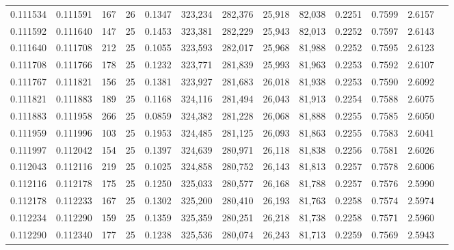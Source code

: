 \begin{tabular}{rrrrrrrrrrrrr}
0.111534 & 0.111591 &   167 &  26 &                                     0.1347 & 323,234 & 282,376 &  25,918 &  82,038 & 0.2251 & 0.7599 & 2.6157 \\
0.111592 & 0.111640 &   147 &  25 &                                     0.1453 & 323,381 & 282,229 &  25,943 &  82,013 & 0.2252 & 0.7597 & 2.6143 \\
0.111640 & 0.111708 &   212 &  25 &                                     0.1055 & 323,593 & 282,017 &  25,968 &  81,988 & 0.2252 & 0.7595 & 2.6123 \\
0.111708 & 0.111766 &   178 &  25 &                                     0.1232 & 323,771 & 281,839 &  25,993 &  81,963 & 0.2253 & 0.7592 & 2.6107 \\
0.111767 & 0.111821 &   156 &  25 &                                     0.1381 & 323,927 & 281,683 &  26,018 &  81,938 & 0.2253 & 0.7590 & 2.6092 \\
0.111821 & 0.111883 &   189 &  25 &                                     0.1168 & 324,116 & 281,494 &  26,043 &  81,913 & 0.2254 & 0.7588 & 2.6075 \\
0.111883 & 0.111958 &   266 &  25 &                                     0.0859 & 324,382 & 281,228 &  26,068 &  81,888 & 0.2255 & 0.7585 & 2.6050 \\
0.111959 & 0.111996 &   103 &  25 &                                     0.1953 & 324,485 & 281,125 &  26,093 &  81,863 & 0.2255 & 0.7583 & 2.6041 \\
0.111997 & 0.112042 &   154 &  25 &                                     0.1397 & 324,639 & 280,971 &  26,118 &  81,838 & 0.2256 & 0.7581 & 2.6026 \\
0.112043 & 0.112116 &   219 &  25 &                                     0.1025 & 324,858 & 280,752 &  26,143 &  81,813 & 0.2257 & 0.7578 & 2.6006 \\
0.112116 & 0.112178 &   175 &  25 &                                     0.1250 & 325,033 & 280,577 &  26,168 &  81,788 & 0.2257 & 0.7576 & 2.5990 \\
0.112178 & 0.112233 &   167 &  25 &                                     0.1302 & 325,200 & 280,410 &  26,193 &  81,763 & 0.2258 & 0.7574 & 2.5974 \\
0.112234 & 0.112290 &   159 &  25 &                                     0.1359 & 325,359 & 280,251 &  26,218 &  81,738 & 0.2258 & 0.7571 & 2.5960 \\
0.112290 & 0.112340 &   177 &  25 &                                     0.1238 & 325,536 & 280,074 &  26,243 &  81,713 & 0.2259 & 0.7569 & 2.5943 \\

\end{tabular}
